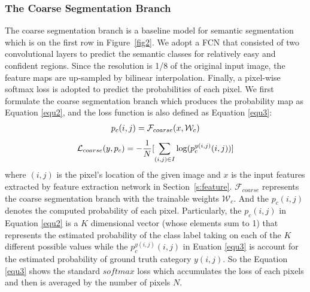\documentclass[10.5pt,compsoc]{TsT}
\theoremstyle{mystyle}
\begin{document}
{\subsubsection{The Coarse Segmentation Branch}
\label{s:cbb}
\noindent

The coarse segmentation branch is a baseline model for semantic segmentation which is on the first row in Figure~\ref{fig2}. We adopt a FCN that consisted of two convolutional layers to predict the semantic classes for relatively easy and confident regions. Since the resolution is 1/8 of the original input image, the feature maps are up-sampled by bilinear interpolation. Finally, a pixel-wise softmax loss is adopted to predict the probabilities of each pixel. We first formulate the coarse segmentation branch which produces the probability map as Equation \ref{equ2}, and the loss function is also defined as Equation \ref{equ3}: 
\begin{equation}\label{equ2}
\setlength\abovedisplayskip{8pt}
\setlength\belowdisplayskip{8pt}
\begin{split}
p_{c}(i,j) &= \mathcal{F}_{coarse}(x, \mathcal{W}_c)\\
\end{split}
\end{equation} 
\begin{equation}\label{equ3}
\setlength\abovedisplayskip{8pt}
\setlength\belowdisplayskip{8pt}
\begin{split}
\mathcal{L}_{coarse}(y, p_c) &= - \frac{1}{N}[\sum_{(i,j)\in I}\log(p^{y(i,j)}_c(i,j))]\\
\end{split}
\end{equation} 
where $(i,j)$ is the pixel's location of the given image and $x$ is the input features extracted by feature extraction network in Section~\ref{s:feature}. $ \mathcal{F}_{coarse}$ represents the coarse segmentation branch with the trainable weights $ \mathcal{W}_c$. And the $p_{c}(i,j)$ denotes the computed probability of each pixel. Particularly, the $p_{c}(i,j)$ in Equation \ref{equ2} is a $K$ dimensional vector (whose elements sum to 1) that represents the estimated probability of the class label taking on each of the $K$ different possible values while the $p^{y(i,j)}_c(i,j)$ in Euation \ref{equ3} is account for the estimated probability of ground truth category $y(i,j)$. So the  Equation \ref{equ3} shows the standard $softmax$ loss which accumulates the loss of each pixels and then is averaged by the number of pixels $N$. 

}
\end{document}
